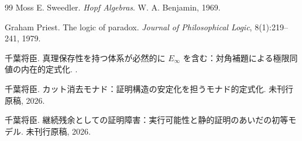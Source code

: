 \documentclass[11pt,a4paper]{article}
\theoremstyle{definition}
\begin{document}
\begin{thebibliography}{99}
Moss E. Sweedler.
\newblock \emph{Hopf Algebras}.
\newblock W. A. Benjamin, 1969.

Graham Priest.
\newblock The logic of paradox.
\newblock \emph{Journal of Philosophical Logic}, 8(1):219--241, 1979.

千葉将臣.
\newblock 真理保存性を持つ体系が必然的に $E_{\infty}$ を含む：対角補題による極限同値の内在的定式化.
.

千葉将臣.
\newblock カット消去モナド：証明構造の安定化を担うモナド的定式化.
\newblock 未刊行原稿, 2026.

千葉将臣.
\newblock 継続残余としての証明障害：実行可能性と静的証明のあいだの初等モデル.
\newblock 未刊行原稿, 2026.

\end{thebibliography}
\end{document}
